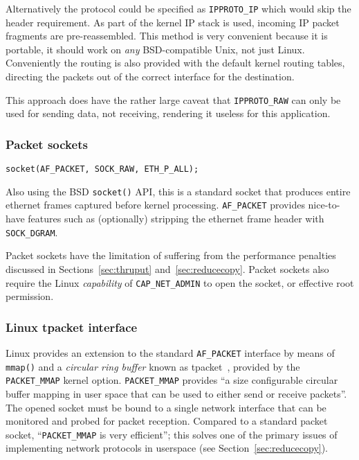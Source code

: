 \documentclass[11pt,a4paper,british]{bhamarticle}
\begin{document}
\begin{multicols}{2}
Alternatively the protocol could be specified as \texttt{IPPROTO\_IP} which would skip the header requirement. As part of the kernel IP stack is used, incoming IP packet fragments are pre-reassembled. This method is very convenient because it is portable, it should work on \textit{any} BSD-compatible Unix, not just Linux. Conveniently the routing is also provided with the default kernel routing tables, directing the packets out of the correct interface for the destination.

This approach does have the rather large caveat that \texttt{IPPROTO\_RAW} can only be used for sending data, not receiving, rendering it useless for this application.

\subsubsection{Packet sockets}
\begin{Verbatim}[fontsize=\small]
socket(AF_PACKET, SOCK_RAW, ETH_P_ALL);
\end{Verbatim}
Also using the BSD \texttt{socket()} API, this is a standard socket that produces entire ethernet frames captured before kernel processing. \texttt{AF\_PACKET} provides nice-to-have features such as (optionally) stripping the ethernet frame header with \texttt{SOCK\_DGRAM}.

Packet sockets have the limitation of suffering from the performance penalties discussed in Sections~\ref{sec:thruput} and~\ref{sec:reducecopy}. Packet sockets also require the Linux \textit{capability} of \texttt{CAP\_NET\_ADMIN} to open the socket, or effective root permission.

\subsubsection{Linux tpacket interface}
Linux provides an extension to the standard \texttt{AF\_PACKET} interface by means of \texttt{mmap()} and a \textit{circular ring buffer} known as tpacket~\cite{tpacket}, provided by the \texttt{PACKET\_MMAP} kernel option. \texttt{PACKET\_MMAP} provides ``a size configurable circular buffer mapping in user space that can be used to either send or receive packets''. The opened socket must be bound to a single network interface that can be monitored and probed for packet reception. Compared to a standard packet socket, ``\texttt{PACKET\_MMAP} is very efficient''; this solves one of the primary issues of implementing network protocols in userspace (see Section~\ref{sec:reducecopy}).


\end{multicols}
\end{document}

